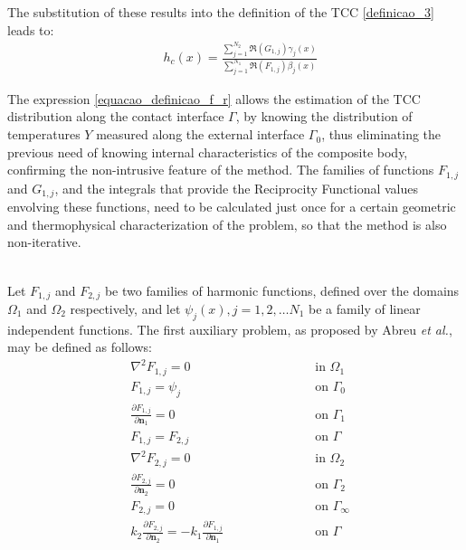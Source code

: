 \documentclass[conference,compsoc,fleqn]{IEEEtran}
\begin{document}
The substitution of these results into the definition of the TCC \eqref{definicao_3} leads to:
\begin{align}
	& h_c(x) %
	= \frac{\displaystyle\sum_{j=1}^{N_2} \Re(G_{1,j}) \gamma_j(x)}{\displaystyle\sum_{j=1}^{N_1} \Re(F_{1,j}) \beta_j(x)}
	\label{equacao_definicao_f_r}
\end{align}

The expression \eqref{equacao_definicao_f_r} allows the estimation of the TCC distribution along the contact interface $\Gamma$, by knowing the distribution of temperatures $Y$ measured along the external interface $\Gamma_0$, thus eliminating the previous need of knowing internal characteristics of the composite body, confirming the non-intrusive feature of the method. The families of functions $F_{1, j}$ and $G_{1, j}$, and the integrals that provide the Reciprocity Functional values envolving these functions, need to be calculated just once for a certain geometric and thermophysical characterization of the problem, so that the method is also non-iterative.
\\

\\


Let $F_{1,j}$ and $F_{2,j}$ be two families of harmonic functions, defined over the domains $\Omega_1$ and $\Omega_2$ respectively, and let $\psi_j(x), j=1,2,\ldots N_1$ be a family of linear independent functions. The first auxiliary problem, as proposed by Abreu \textit{et al.}\cite{artigo_abreu_3}, may be defined as follows:
\begin{subequations}
	\begin{alignat}{2}
		& \nabla^2 F_{1,j} = 0 \quad\quad\quad\quad\quad && \text{ in } \Omega_1 \label{funcao_F_harm_T1} \\
		& F_{1,j} = \psi_j && \text{ on } \Gamma_0  \label{funcao_F_cc_T1_2} \\
		& \frac{\partial F_{1,j}}{\partial \mathbf{n}_1} = 0 && \text{ on }  \Gamma_1 \label{funcao_F_cc_T1_1} \\ 
		& F_{1,j} = F_{2, j} \quad\quad\quad\quad\quad\quad\quad\quad && \text{ on }  \Gamma \label{funcao_F_cc_grad_T1} \\
		& \nabla^2 F_{2,j} = 0 && \text{ in }  \Omega_2 \label{funcao_F_harm_T2} \\
		& \frac{\partial F_{2,j}}{\partial \mathbf{n}_2} = 0 && \text{ on }  \Gamma_2 \label{funcao_F_cc_T1_3} \\
		& F_{2,j} = 0 && \text{ on }  \Gamma_\infty \label{funcao_F_cc_T1_4} \\
		& k_2\frac{\partial F_{2, j}}{\partial\mathbf{n}_2} = - k_1\frac{\partial F_{1,j}}{\partial\mathbf{n}_1} && \text{ on }  \Gamma \label{funcao_F_cc_T1_5}
	\end{alignat}
\end{subequations}
\\
\end{document}
